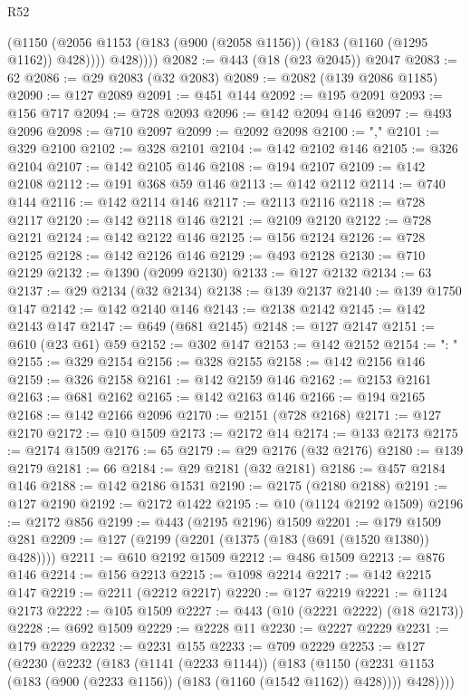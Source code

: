 \begin{lexlean}{R52}
\begin{coremodule}
            (@1150 (@2056 @1153 (@183 (@900 (@2058 @1156)) (@183 (@1160 (@1295 @1162)) @428))))
            @428))))
@2082 := @443 (@18 (@23 @2045)) @2047
@2083 := 62
@2086 := @29 @2083 (@32 @2083)
@2089 := @2082 (@139 @2086 @1185)
@2090 := @127 @2089
@2091 := @451 @144
@2092 := @195 @2091
@2093 := @156 @717
@2094 := @728 @2093
@2096 := @142 @2094 @146
@2097 := @493 @2096
@2098 := @710 @2097
@2099 := @2092 @2098
@2100 := ","
@2101 := @329 @2100
@2102 := @328 @2101
@2104 := @142 @2102 @146
@2105 := @326 @2104
@2107 := @142 @2105 @146
@2108 := @194 @2107
@2109 := @142 @2108
@2112 := @191 @368 @59 @146
@2113 := @142 @2112
@2114 := @740 @144
@2116 := @142 @2114 @146
@2117 := @2113 @2116
@2118 := @728 @2117
@2120 := @142 @2118 @146
@2121 := @2109 @2120
@2122 := @728 @2121
@2124 := @142 @2122 @146
@2125 := @156 @2124
@2126 := @728 @2125
@2128 := @142 @2126 @146
@2129 := @493 @2128
@2130 := @710 @2129
@2132 := @1390 (@2099 @2130)
@2133 := @127 @2132
@2134 := 63
@2137 := @29 @2134 (@32 @2134)
@2138 := @139 @2137
@2140 := @139 @1750 @147
@2142 := @142 @2140 @146
@2143 := @2138 @2142
@2145 := @142 @2143 @147
@2147 := @649 (@681 @2145)
@2148 := @127 @2147
@2151 := @610 (@23 @61) @59
@2152 := @302 @147
@2153 := @142 @2152
@2154 := ": "
@2155 := @329 @2154
@2156 := @328 @2155
@2158 := @142 @2156 @146
@2159 := @326 @2158
@2161 := @142 @2159 @146
@2162 := @2153 @2161
@2163 := @681 @2162
@2165 := @142 @2163 @146
@2166 := @194 @2165
@2168 := @142 @2166 @2096
@2170 := @2151 (@728 @2168)
@2171 := @127 @2170
@2172 := @10 @1509
@2173 := @2172 @14
@2174 := @133 @2173
@2175 := @2174 @1509
@2176 := 65
@2179 := @29 @2176 (@32 @2176)
@2180 := @139 @2179
@2181 := 66
@2184 := @29 @2181 (@32 @2181)
@2186 := @457 @2184 @146
@2188 := @142 @2186 @1531
@2190 := @2175 (@2180 @2188)
@2191 := @127 @2190
@2192 := @2172 @1422
@2195 := @10 (@1124 @2192 @1509)
@2196 := @2172 @856
@2199 := @443 (@2195 @2196) @1509
@2201 := @179 @1509 @281
@2209 := @127 (@2199 (@2201 (@1375 (@183 (@691 (@1520 @1380)) @428))))
@2211 := @610 @2192 @1509
@2212 := @486 @1509
@2213 := @876 @146
@2214 := @156 @2213
@2215 := @1098 @2214
@2217 := @142 @2215 @147
@2219 := @2211 (@2212 @2217)
@2220 := @127 @2219
@2221 := @1124 @2173
@2222 := @105 @1509
@2227 := @443 (@10 (@2221 @2222) (@18 @2173))
@2228 := @692 @1509
@2229 := @2228 @11
@2230 := @2227 @2229
@2231 := @179 @2229
@2232 := @2231 @155
@2233 := @709 @2229
@2253 := @127
    (@2230
      (@2232
        (@183
          (@1141 (@2233 @1144))
          (@183
            (@1150 (@2231 @1153 (@183 (@900 (@2233 @1156)) (@183 (@1160 (@1542 @1162)) @428))))
            @428))))

\end{coremodule}
\end{lexlean}

